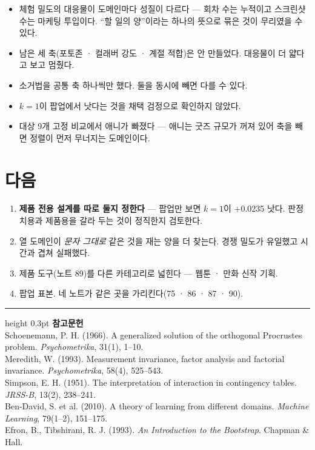 \documentclass[10pt]{article}
\begin{document}
\begin{itemize}[leftmargin=1.1em,itemsep=0.15em]
\item 체험 밀도의 대응물이 도메인마다 성질이 다르다 --- 회차 수는 누적이고
      스크린샷 수는 마케팅 투입이다. ``할 일의 양''이라는 하나의 뜻으로
      묶은 것이 무리였을 수 있다.
\item 남은 세 축(포토존 · 컬래버 강도 · 계절 적합)은 안 만들었다. 대응물이
      더 얇다고 보고 멈췄다.
\item 소거법을 공통 축 하나씩만 했다. 둘을 동시에 빼면 다를 수 있다.
\item $k{=}1$이 팝업에서 낫다는 것을 채택 검정으로 확인하지 않았다.
\item 대상 9개 고정 비교에서 애니가 빠졌다 --- 애니는 굿즈 규모가 꺼져 있어
      축을 빼면 정렬이 먼저 무너지는 도메인이다.
\end{itemize}

\section{다음}

\begin{enumerate}[leftmargin=1.3em,itemsep=0.15em]
\item \textbf{제품 전용 설계를 따로 둘지 정한다} --- 팝업만 보면 $k{=}1$이
      $+$0.0235 낫다. 판정치용과 제품용을 갈라 두는 것이 정직한지 검토한다.
\item 열 도메인이 \emph{문자 그대로} 같은 것을 재는 양을 더 찾는다. 경쟁 밀도가
      유일했고 시간과 겹쳐 실패했다.
\item 제품 도구(노트 89)를 다른 카테고리로 넓힌다 --- 웹툰 · 만화 신작 기획.
\item 팝업 표본. 네 노트가 같은 곳을 가리킨다(75 · 86 · 87 · 90).
\end{enumerate}

\vspace{0.6em}
\hrule height 0.3pt
\vspace{0.5em}
{\footnotesize
\textbf{참고문헌}\\[0.3em]
Schoenemann, P. H. (1966). A generalized solution of the orthogonal Procrustes
problem. \emph{Psychometrika}, 31(1), 1--10.\\[0.15em]
Meredith, W. (1993). Measurement invariance, factor analysis and factorial
invariance. \emph{Psychometrika}, 58(4), 525--543.\\[0.15em]
Simpson, E. H. (1951). The interpretation of interaction in contingency tables.
\emph{JRSS-B}, 13(2), 238--241.\\[0.15em]
Ben-David, S. et al. (2010). A theory of learning from different domains.
\emph{Machine Learning}, 79(1--2), 151--175.\\[0.15em]
Efron, B., Tibshirani, R. J. (1993). \emph{An Introduction to the Bootstrap}.
Chapman \& Hall.
}
\end{document}
